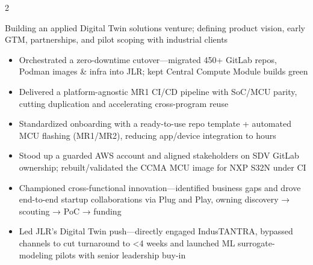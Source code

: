 \documentclass[10pt,a4paper,withhyper]{altacv}
\begin{document}
\begin{paracol}{2}


 Building an applied Digital Twin solutions venture; defining product vision, early GTM, partnerships, and pilot scoping with industrial clients

\divider

\begin{itemize}
\item Orchestrated a zero-downtime cutover—migrated 450+ GitLab repos, Podman images \& infra into JLR; kept Central Compute Module builds green
\item Delivered a platform-agnostic MR1 CI/CD pipeline with SoC/MCU parity, cutting duplication and accelerating cross-program reuse
\item Standardized onboarding with a ready-to-use repo template + automated MCU flashing (MR1/MR2), reducing app/device integration to hours
\item Stood up a guarded AWS account and aligned stakeholders on SDV GitLab ownership; rebuilt/validated the CCMA MCU image for NXP S32N under CI
\end{itemize}

\divider



\begin{itemize}
\item Championed cross-functional innovation—identified business gaps and drove end-to-end startup collaborations via Plug and Play, owning discovery → scouting → PoC → funding
\item Led JLR’s Digital Twin push—directly engaged IndusTANTRA, bypassed channels to cut turnaround to <4 weeks and launched ML surrogate-modeling pilots with senior leadership buy-in
\end{itemize}

\divider



\end{paracol}
\end{document}
